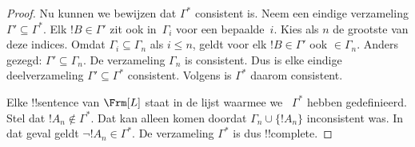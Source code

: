 \documentclass[openany]{memoir}
\begin{document}
\begin{proof}
Nu kunnen we bewijzen dat $\Gamma^*$ consistent is. Neem een eindige
verzameling $\Gamma' \subseteq \Gamma^*$. Elk $!B \in \Gamma'$ zit ook
in~$\Gamma_i$ voor een bepaalde~$i$. Kies als $n$ de grootste van deze
indices. Omdat $\Gamma_i \subseteq \Gamma_n$ als $i \le n$, geldt
voor elk $!B \in \Gamma'$ ook $\in \Gamma_n$. Anders gezegd:
$\Gamma' \subseteq \Gamma_n$. De verzameling $\Gamma_n$ is consistent.
Dus is elke eindige deelverzameling $\Gamma' \subseteq \Gamma^*$
consistent. Volgens  is $\Gamma^*$ daarom
consistent.

Elke !!{sentence} van $\Frm[L]$ staat in de lijst waarmee we
~$\Gamma^*$ hebben gedefinieerd. Stel dat $!A_n \notin \Gamma^*$. Dat
kan alleen komen doordat $\Gamma_n \cup \{!A_n\}$ inconsistent was. In
dat geval geldt $\lnot !A_n \in \Gamma^*$. De verzameling $\Gamma^*$ is
dus !!{complete}.
\end{proof}
\endgroup

\begingroup
\def\olfilename{OLP-0132}
\def\olfilepath{content/first-order-logic/completeness/}
\hypertarget{unit-OLP-0132}{}



      {}
      {}

\end{document}
